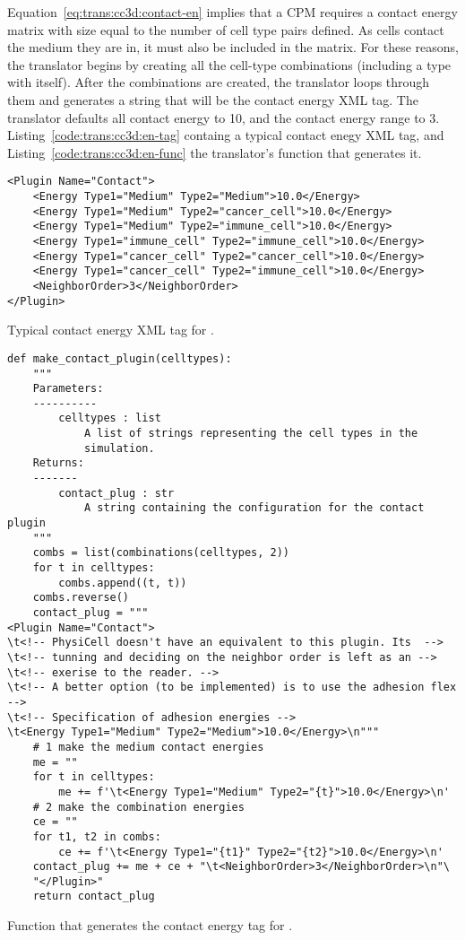 Equation~\ref{eq:trans:cc3d:contact-en} implies that a CPM requires a contact energy matrix with size equal to the number of cell type pairs defined. As cells contact the medium they are in, it must also be included in the matrix. For these reasons, the translator begins by creating all the cell-type combinations (including a type with itself). After the combinations are created, the translator loops through them and generates a string that will be the contact energy XML tag. The translator defaults all contact energy to 10, and the contact energy range to 3. Listing~\ref{code:trans:cc3d:en-tag} containg a typical contact enegy XML tag, and Listing~\ref{code:trans:cc3d:en-func} the translator's function that generates it.
\begin{listing}[H]%
\begin{verbatim}
<Plugin Name="Contact">
	<Energy Type1="Medium" Type2="Medium">10.0</Energy>
	<Energy Type1="Medium" Type2="cancer_cell">10.0</Energy>
	<Energy Type1="Medium" Type2="immune_cell">10.0</Energy>
	<Energy Type1="immune_cell" Type2="immune_cell">10.0</Energy>
	<Energy Type1="cancer_cell" Type2="cancer_cell">10.0</Energy>
	<Energy Type1="cancer_cell" Type2="immune_cell">10.0</Energy>
	<NeighborOrder>3</NeighborOrder>
</Plugin>
\end{verbatim}
\caption{Typical contact energy XML tag for \ccd.}\label{code:trans:cc3d:en-tag}
\end{listing}
\begin{listing}[H]%
\begin{verbatim}
def make_contact_plugin(celltypes):
    """
    Parameters:
    ----------
        celltypes : list
            A list of strings representing the cell types in the 
            simulation.
    Returns:
    -------
        contact_plug : str
            A string containing the configuration for the contact plugin
    """
    combs = list(combinations(celltypes, 2))
    for t in celltypes:
        combs.append((t, t))
    combs.reverse()
    contact_plug = """
<Plugin Name="Contact">
\t<!-- PhysiCell doesn't have an equivalent to this plugin. Its  -->
\t<!-- tunning and deciding on the neighbor order is left as an -->
\t<!-- exerise to the reader. -->
\t<!-- A better option (to be implemented) is to use the adhesion flex 
-->
\t<!-- Specification of adhesion energies -->
\t<Energy Type1="Medium" Type2="Medium">10.0</Energy>\n"""
    # 1 make the medium contact energies
    me = ""
    for t in celltypes:
        me += f'\t<Energy Type1="Medium" Type2="{t}">10.0</Energy>\n'
    # 2 make the combination energies
    ce = ""
    for t1, t2 in combs:
        ce += f'\t<Energy Type1="{t1}" Type2="{t2}">10.0</Energy>\n'
    contact_plug += me + ce + "\t<NeighborOrder>3</NeighborOrder>\n"\
    "</Plugin>"
    return contact_plug
\end{verbatim}
\caption{Function that generates the contact energy tag for \ccd. }\label{code:trans:cc3d:en-func}
\end{listing}

